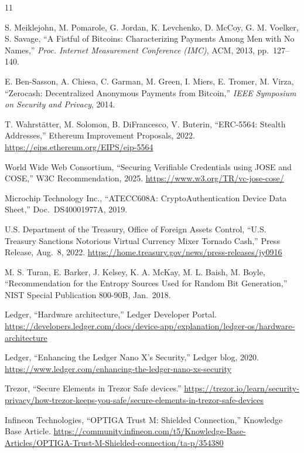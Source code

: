 \documentclass[10pt]{article}
\begin{document}
\begin{thebibliography}{11}
\small

S. Meiklejohn, M. Pomarole, G. Jordan, K. Levchenko, D. McCoy, G. M. Voelker, S. Savage,
``A Fistful of Bitcoins: Characterizing Payments Among Men with No Names,''
\emph{Proc. Internet Measurement Conference (IMC)}, ACM, 2013, pp.\ 127--140.

E. Ben-Sasson, A. Chiesa, C. Garman, M. Green, I. Miers, E. Tromer, M. Virza,
``Zerocash: Decentralized Anonymous Payments from Bitcoin,''
\emph{IEEE Symposium on Security and Privacy}, 2014.

T. Wahrst\"atter, M. Solomon, B. DiFrancesco, V. Buterin,
``ERC-5564: Stealth Addresses,'' Ethereum Improvement Proposals, 2022.
\url{https://eips.ethereum.org/EIPS/eip-5564}

World Wide Web Consortium,
``Securing Verifiable Credentials using JOSE and COSE,'' W3C Recommendation, 2025.
\url{https://www.w3.org/TR/vc-jose-cose/}

Microchip Technology Inc.,
``ATECC608A: CryptoAuthentication Device Data Sheet,'' Doc.\ DS40001977A, 2019.

U.S. Department of the Treasury, Office of Foreign Assets Control,
``U.S. Treasury Sanctions Notorious Virtual Currency Mixer Tornado Cash,'' Press Release, Aug.\ 8, 2022.
\url{https://home.treasury.gov/news/press-releases/jy0916}

M. S. Turan, E. Barker, J. Kelsey, K. A. McKay, M. L. Baish, M. Boyle,
``Recommendation for the Entropy Sources Used for Random Bit Generation,''
NIST Special Publication 800-90B, Jan.\ 2018.

Ledger,
``Hardware architecture,'' Ledger Developer Portal.
\url{https://developers.ledger.com/docs/device-app/explanation/ledger-os/hardware-architecture}

Ledger,
``Enhancing the Ledger Nano X's Security,'' Ledger blog, 2020.
\url{https://www.ledger.com/enhancing-the-ledger-nano-xs-security}

Trezor,
``Secure Elements in Trezor Safe devices.''
\url{https://trezor.io/learn/security-privacy/how-trezor-keeps-you-safe/secure-elements-in-trezor-safe-devices}

Infineon Technologies,
``OPTIGA Trust M: Shielded Connection,'' Knowledge Base Article.
\url{https://community.infineon.com/t5/Knowledge-Base-Articles/OPTIGA-Trust-M-Shielded-connection/ta-p/354380}

\end{thebibliography}
\end{document}
